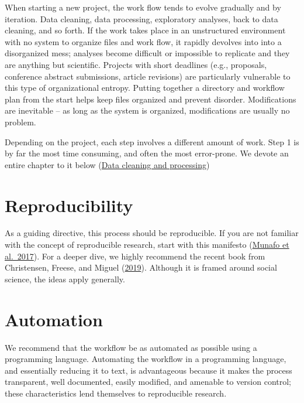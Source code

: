 \documentclass[
]{book}
\begin{document}
When starting a new project, the work flow tends to evolve gradually and by iteration. Data cleaning, data processing, exploratory analyses, back to data cleaning, and so forth. If the work takes place in an unstructured environment with no system to organize files and work flow, it rapidly devolves into into a disorganized mess; analyses become difficult or impossible to replicate and they are anything but scientific. Projects with short deadlines (e.g., proposals, conference abstract submissions, article revisions) are particularly vulnerable to this type of organizational entropy. Putting together a directory and workflow plan from the start helps keep files organized and prevent disorder. Modifications are inevitable -- as long as the system is organized, modifications are usually no problem.

Depending on the project, each step involves a different amount of work. Step 1 is by far the most time consuming, and often the most error-prone. We devote an entire chapter to it below (\protect\hyperlink{datacleaning}{Data cleaning and processing})

\hypertarget{reproducibility}{%
\section{Reproducibility}\label{reproducibility}}

As a guiding directive, this process should be reproducible. If you are not familiar with the concept of reproducible research, start with this manifesto (\href{https://www.nature.com/articles/s41562-016-0021}{Munafo et al.~2017}). For a deeper dive, we highly recommend the recent book from Christensen, Freese, and Miguel (\href{https://www.ucpress.edu/book/9780520296954/transparent-and-reproducible-social-science-research}{2019}). Although it is framed around social science, the ideas apply generally.

\hypertarget{automation}{%
\section{Automation}\label{automation}}

We recommend that the workflow be as automated as possible using a programming language. Automating the workflow in a programming language, and essentially reducing it to text, is advantageous because it makes the process transparent, well documented, easily modified, and amenable to version control; these characteristics lend themselves to reproducible research.
\end{document}
